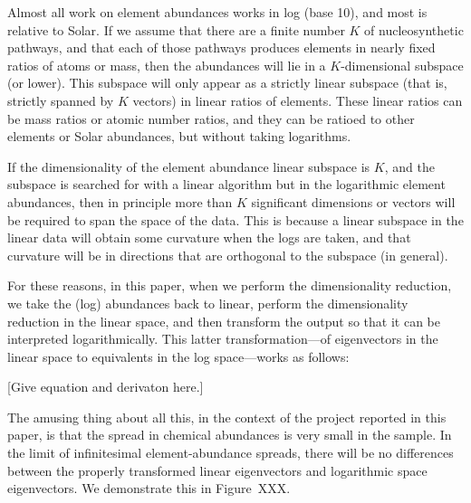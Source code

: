 \documentclass[letterpaper, modern]{aastex62}
\begin{document}
Almost all work on element abundances works in log (base 10), and most is
relative to Solar.
If we assume that there are a finite number $K$ of nucleosynthetic pathways,
and that each of those pathways produces elements in nearly fixed
ratios of atoms or mass, then the abundances will lie in a $K$-dimensional
subspace (or lower).
This subspace will only appear as a strictly linear subspace (that is, strictly
spanned by $K$ vectors) in linear ratios of elements.
These linear ratios can be mass ratios or atomic number ratios, and they can be ratioed
to other elements or Solar abundances, but without taking logarithms.

If the dimensionality of the element abundance linear subspace is $K$, and the
subspace is searched for with a linear algorithm but in the logarithmic element
abundances, then in principle more than $K$ significant dimensions or vectors
will be required to span the space of the data.
This is because a linear subspace in the linear data will obtain some curvature
when the logs are taken, and that curvature will be in directions that are orthogonal
to the subspace (in general).

For these reasons, in this paper, when we perform the dimensionality reduction,
we take the (log) abundances back to linear, perform the dimensionality reduction
in the linear space, and then transform the output so that it can be interpreted
logarithmically.
This latter transformation---of eigenvectors in the linear space to equivalents
in the log space---works as follows:

[Give equation and derivaton here.]

The amusing thing about all this, in the context of the project reported in this paper,
is that the spread in chemical abundances is very small in the sample.
In the limit of infinitesimal element-abundance spreads, there will be no differences
between the properly transformed linear eigenvectors and logarithmic space eigenvectors.
We demonstrate this in Figure~XXX.
\end{document}
